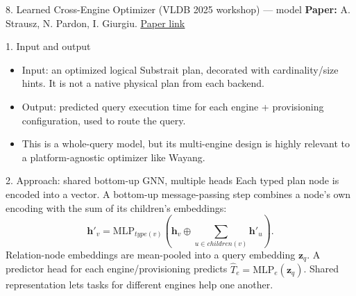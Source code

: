 \documentclass[aspectratio=169,10pt]{beamer}
\newcommand{\paperlink}[2]{\href{#1}{\textcolor{WayangTeal}{\underline{#2}}}}
\begin{document}
\begin{frame}[shrink=10]{8. Learned Cross-Engine Optimizer (VLDB 2025 workshop) — model}
\small
\textbf{Paper:} A. Strausz, N. Pardon, I. Giurgiu.
\hfill\paperlink{https://www.vldb.org/2025/Workshops/VLDB-Workshops-2025/CDMS/CDMS25_06.pdf}{Paper link}

\begin{block}{1. Input and output}
\begin{itemize}\setlength\itemsep{1pt}
  \item Input: an optimized logical Substrait plan, decorated with cardinality/size hints. It is not a native physical plan from each backend.
  \item Output: predicted query execution time for each engine + provisioning configuration, used to route the query.
  \item This is a whole-query model, but its multi-engine design is highly relevant to a platform-agnostic optimizer like Wayang.
\end{itemize}
\end{block}

\begin{block}{2. Approach: shared bottom-up GNN, multiple heads}
Each typed plan node is encoded into a vector. A bottom-up message-passing step combines a node's own encoding with the sum of its children's embeddings:
\[
\mathbf h'_v=\mathrm{MLP}_{type(v)}\!\left(\mathbf h_v\oplus\sum_{u\in children(v)}\mathbf h'_u\right).
\]
Relation-node embeddings are mean-pooled into a query embedding $\mathbf z_q$. A predictor head for each engine/provisioning predicts $\widehat T_e=\mathrm{MLP}_e(\mathbf z_q)$. Shared representation lets tasks for different engines help one another.
\end{block}
\end{frame}
\end{document}
